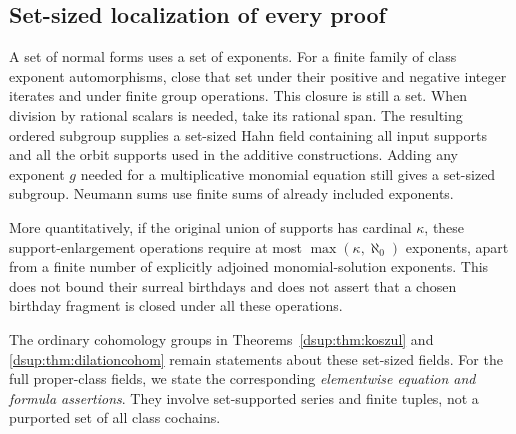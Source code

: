 \documentclass[11pt,oneside]{article}
\numberwithin{equation}{section}
\theoremstyle{definition}
\theoremstyle{remark}
\begin{document}
\subsection{Set-sized localization of every proof}

A set of normal forms uses a set of exponents. For a finite family of
class exponent automorphisms, close that set under their positive and
negative integer iterates and under finite group operations. This
closure is still a set. When division by rational scalars is needed,
take its rational span. The resulting ordered subgroup supplies a
set-sized Hahn field containing all input supports and all the orbit
supports used in the additive constructions. Adding any exponent $g$
needed for a multiplicative monomial equation still gives a set-sized
subgroup. Neumann sums use finite sums of already included exponents.

More quantitatively, if the original union of supports has cardinal
$\kappa$, these support-enlargement operations require at most
$\max(\kappa,\aleph_0)$ exponents, apart from a finite number of explicitly
adjoined monomial-solution exponents. This does not bound their surreal
birthdays and does not assert that a chosen birthday fragment is closed
under all these operations.

The ordinary cohomology groups in Theorems~\ref{dsup:thm:koszul} and
\ref{dsup:thm:dilationcohom} remain statements about these set-sized fields.
For the full proper-class fields, we state the corresponding
\emph{elementwise equation and formula assertions}. They involve
set-supported series and finite tuples, not a purported set of all
class cochains.
\end{document}
